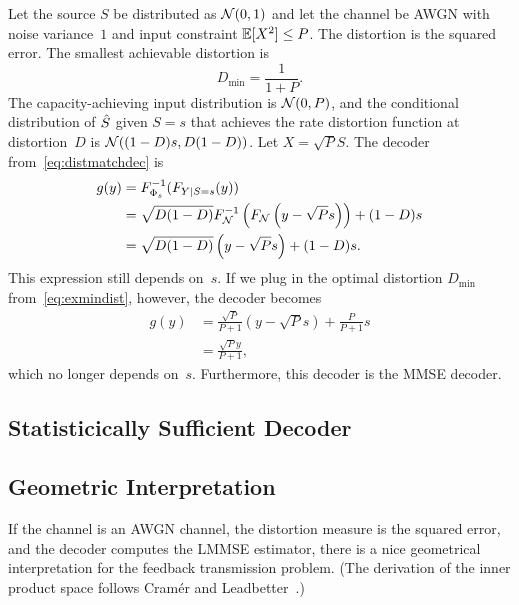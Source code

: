 \begin{example}
  Let the source $S$ be distributed as ${\mathcal{N}}(0,1)$ and let the channel be AWGN
  with noise variance~$1$ and input constraint $\mathbb{E}[X^2] \le P$.
  The distortion is the squared error. The smallest achievable distortion is
  \begin{equation}
    \label{eq:exmindist}
    D_{\min} = \frac{1}{1 + P}.
  \end{equation}
  The capacity-achieving input distribution is ${\mathcal{N}}(0,P)$, and the conditional
  distribution of ${\hat{S}}$ given $S=s$ that achieves the rate distortion function
  at distortion~$D$ is ${\mathcal{N}}((1-D)s, D(1-D))$.
  Let $X = \sqrt{P}S$.  The decoder from~\eqref{eq:distmatchdec} is
  \begin{align*}
    g(y) &= F_{\Phi_s}^{-1} (F_{Y|S=s}(y)) \\
    &= \sqrt{D(1-D)} F_{{\mathcal{N}}}^{-1} \left( F_{{\mathcal{N}}}\left( y-\sqrt{P}s
    \right) \right) + (1-D)s \\
    &= \sqrt{D(1-D)} \left( y-\sqrt{P}s \right) + (1-D)s.
  \end{align*}
  This expression still depends on~$s$. If we plug in the optimal distortion
  $D_{\min}$ from~\eqref{eq:exmindist}, however, the decoder becomes
  \begin{align*}
    g(y) &= \frac{\sqrt{P}}{P+1} (y - \sqrt{P}s) + \frac{P}{P +
    1}s \\ 
    &= \frac{\sqrt{P}y}{P + 1},
  \end{align*}
  which no longer depends on~$s$. Furthermore, this decoder is the MMSE decoder.
\end{example}

\subsection{Statisticically Sufficient Decoder}


\subsection{Geometric Interpretation}

If the channel is an AWGN channel, the distortion measure is the squared error,
and the decoder computes the LMMSE estimator, there is a nice geometrical
interpretation for the feedback transmission problem. (The derivation of the
inner product space follows Cramér and
Leadbetter~\cite[Section~5.6]{CramerL1967}.)


